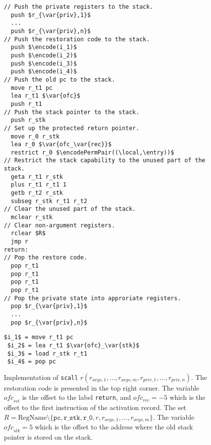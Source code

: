 \documentclass[format=acmsmall, review=true, screen=true]{acmart}
\newcommand{\var}[1]{\mathit{#1}}
\newcommand{\plainfun}[2]{
  \ifthenelse{\equal{#2}{}}
  {\mathit{#1}}
  {\mathit{#1}(#2)}
}
\newcommand{\encode}{\plainfun{encode}{}}
\newcommand{\encodePermPair}{\plainfun{encodePermPair}{}}
\newcommand{\plaindom}[1]{\mathrm{#1}}
\newcommand{\RegName}{\plaindom{RegName}}
\newcommand{\plainperm}[1]{\textsc{#1}}
\newcommand{\entry}{\plainperm{e}}
\newcommand{\plainlocality}[1]{\mathrm{#1}}
\newcommand{\local}{\plainlocality{local}}
\newenvironment{toplas}%
    {\color{OliveGreen}}{}
\begin{document}
\begin{toplas}
\begin{figure}[htb]
  \begin{toplas}
    \centering
    \begin{minipage}[t]{.6\linewidth}
\begin{lstlisting}
// Push the private registers to the stack.
  push $r_{\var{priv},1}$
  ...
  push $r_{\var{priv},n}$
// Push the restoration code to the stack.
  push $\encode(i_1)$
  push $\encode(i_2)$
  push $\encode(i_3)$
  push $\encode(i_4)$
// Push the old pc to the stack.
  move r_t1 pc
  lea r_t1 $\var{ofc}$ 
  push r_t1
// Push the stack pointer to the stack.
  push r_stk
// Set up the protected return pointer.
  move r_0 r_stk
  lea r_0 $\var{ofc_\var{rec}}$
  restrict r_0 $\encodePermPair((\local,\entry))$
// Restrict the stack capability to the unused part of the stack.
  geta r_t1 r_stk
  plus r_t1 r_t1 1
  getb r_t2 r_stk
  subseg r_stk r_t1 r_t2
// Clear the unused part of the stack.
  mclear r_stk
// Clear non-argument registers.
  rclear $R$
  jmp r
return:
// Pop the restore code.
  pop r_t1
  pop r_t1
  pop r_t1
  pop r_t1
// Pop the private state into approriate registers.
  pop $r_{\var{priv},1}$
  ...
  pop $r_{\var{priv},n}$
\end{lstlisting}      
    \end{minipage}
    \begin{minipage}[t]{.29\linewidth}
\begin{lstlisting}[title=\footnotesize{The restoration code used in \texttt{scall}.}, captionpos=b,frame=single,numbers=none]
 $i_1$ = move r_t1 pc
 $i_2$ = lea r_t1 $\var{ofc}_\var{stk}$
 $i_3$ = load r_stk r_t1
 $i_4$ = pop pc
\end{lstlisting}
    \end{minipage}%
    \caption{Implementation of \texttt{scall} $r(r_{\var{args},1},\dots,
      r_{\var{args},m},r_{\var{priv},1},\dots, r_{\var{priv},n})$. The
      restoration code is presented in the top right corner. The
      variable $\var{ofc}_\var{ret}$ is the offset to the label \texttt{return}, and
      $\var{ofc_\var{rec}} = -5$ which is the offset to the first instruction of
      the activation record. The set $R = \RegName \setminus
      \{\texttt{pc},\texttt{r\_stk},\texttt{r\_0},r,r_{\var{args},1},\dots,r_{\var{args},m}\}$.
    The variable $\var{ofc}_\var{stk} =5$ which is the offset to the address
    where the old stack pointer is stored on the stack.}
    \label{fig:scall-impl}
  \end{toplas}
\end{figure}


\end{toplas}
\end{document}
